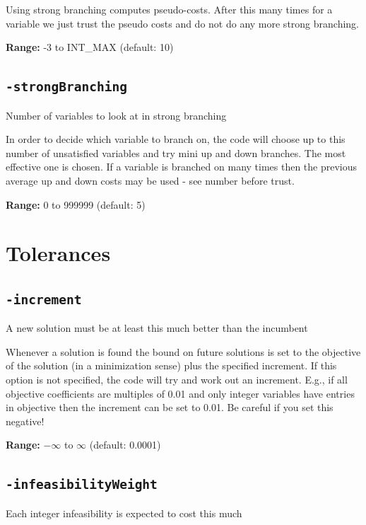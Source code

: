 \documentclass[11pt,a4paper]{article}
\begin{document}
Using strong branching computes pseudo-costs.  After this many times for a variable we just trust the pseudo costs and do not do any more strong branching.

\textbf{Range:} -3 to INT\_MAX (default: 10)

\subsection*{\texttt{-strongBranching}}

Number of variables to look at in strong branching

In order to decide which variable to branch on, the code will choose up to this number of unsatisfied variables and try mini up and down branches.  The most effective one is chosen. If a variable is branched on many times then the previous average up and down costs may be used - see number before trust.

\textbf{Range:} 0 to 999999 (default: 5)

\section{Tolerances}

\subsection*{\texttt{-increment}}

A new solution must be at least this much better than the incumbent

Whenever a solution is found the bound on future solutions is set to the objective of the solution (in a minimization sense) plus the specified increment.  If this option is not specified, the code will try and work out an increment.  E.g., if all objective coefficients are multiples of 0.01 and only integer variables have entries in objective then the increment can be set to 0.01.  Be careful if you set this negative!

\textbf{Range:} $-\infty$ to $\infty$ (default: 0.0001)

\subsection*{\texttt{-infeasibilityWeight}}

Each integer infeasibility is expected to cost this much
\end{document}

